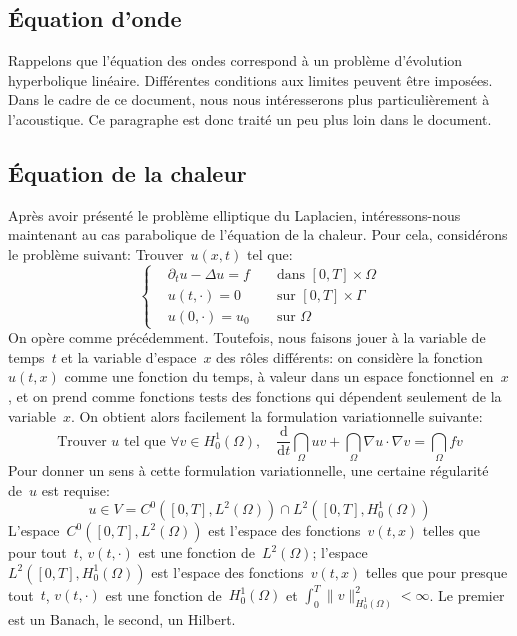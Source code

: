 \medskip
\subsection{Équation d'onde}
Rappelons que l'équation des ondes correspond à un problème d'évolution
hyperbolique linéaire.
Différentes conditions aux limites peuvent être imposées.
Dans le cadre de ce document, nous nous intéresserons plus particulièrement
à l'acoustique.
Ce paragraphe est donc traité un peu plus loin dans le document.

\medskip
\subsection{Équation de la chaleur}
Après avoir présenté le problème elliptique du Laplacien, intéressons-nous
maintenant au cas parabolique de l'équation de la chaleur.
Pour cela, considérons le problème suivant:
Trouver~$u(x,t)$ tel que:
\begin{equation}
\left\{
\begin{aligned}
&\partial_t u -\Delta u = f &&\text{ dans } [0,T]\times\Omega\\
&u(t,\cdot) = 0 &&\text{ sur } [0,T]\times\Gamma\\
&u(0,\cdot)=u_0 &&\text{ sur } \Omega
\end{aligned}
\right.
\end{equation}
\medskip
On opère comme précédemment.
Toutefois, nous faisons jouer à la variable de temps~$t$ et la variable d'espace~$x$
des rôles différents: on considère la fonction~$u(t, x)$ comme une fonction
du temps, à valeur dans un espace fonctionnel en~$x$, et on prend comme fonctions
tests des fonctions qui dépendent seulement de la variable~$x$.
On obtient alors facilement la formulation variationnelle suivante:
\begin{equation}
\text{Trouver } u \text{ tel que } \forall v\in H^1_0(\Omega),\quad
\dfrac{\mathrm d}{\mathrm dt}\dint_\Omega uv+\dint_\Omega \nabla u\cdot\nabla v=\dint_\Omega fv
\end{equation}
Pour donner un sens à cette formulation variationnelle, une certaine régularité de~$u$ est requise:
\begin{equation}
u\in V = C^0\left([0,T],L^2(\Omega)\right)\cap L^2\left([0,T],H^1_0(\Omega)\right)
\end{equation}
L'espace~$C^0\left([0,T],L^2(\Omega)\right)$ est l'espace des fonctions~$v(t,x)$ telles
que pour tout~$t$, $v(t,\cdot)$ est une fonction de~$L^2(\Omega)$;
l'espace~$L^2\left([0,T],H^1_0(\Omega)\right)$ est l'espace des fonctions~$v(t,x)$ telles
que pour presque tout~$t$, $v(t,\cdot)$ est une fonction de~$H^1_0(\Omega)$ et
$\int_0^T \|v\|^2_{H^1_0(\Omega)}<\infty$. Le premier est un Banach, le second, un Hilbert.

